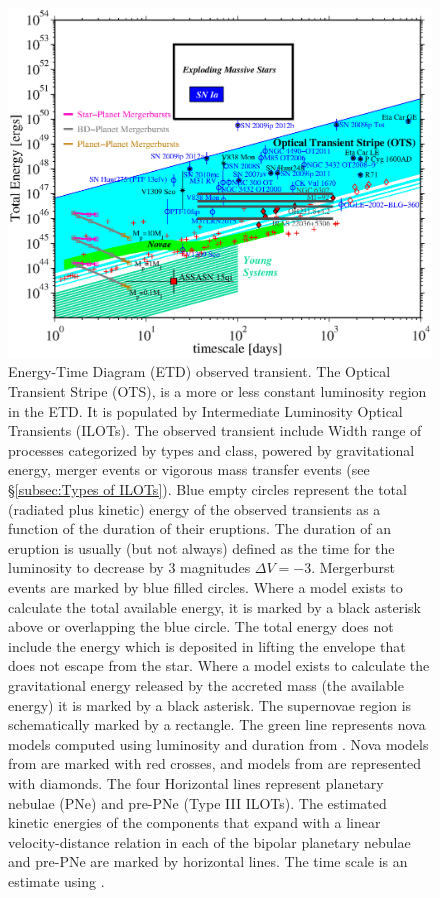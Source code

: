 \documentclass[a4paper,12pt,modern]{aastex62}
\begin{document}
\begin{figure}[ht!]
\includegraphics[width=\linewidth]{etd.eps}
\caption{Energy-Time Diagram (ETD) observed transient. The Optical Transient Stripe (OTS), is a more or less constant luminosity region in the ETD. It is populated by Intermediate Luminosity Optical Transients (ILOTs). The observed transient include Width range of processes categorized by types and class, powered by gravitational energy, merger events or vigorous mass transfer events (see \S\ref{subsec:Types of ILOTs}). Blue empty circles represent the total (radiated plus kinetic) energy of the observed transients as a function of the duration of their eruptions. The duration of an eruption is usually (but not always) defined as the time for the luminosity to decrease by 3 magnitudes $\Delta V=-3$. 
Mergerburst events are marked by blue filled circles. Where a model exists to calculate the total available energy, it is marked by a black asterisk above or overlapping the blue circle. The total energy does not include the energy which is deposited in lifting the envelope that does not escape from the star. Where a model exists to calculate the gravitational energy released by the accreted mass (the available energy) it is marked by a black asterisk.
The supernovae region is schematically marked by a rectangle. The green line represents nova models computed using luminosity and duration from \cite{1995ApJ...452..704D}. Nova models from \cite{2005ApJ...623..398Y} are marked with red crosses, and models from \cite{2010ApJ...725..831S} are represented with diamonds.
The four Horizontal lines represent planetary nebulae (PNe) and pre-PNe (Type III ILOTs). The estimated kinetic energies of the components that expand with a linear velocity-distance relation in each of the bipolar planetary nebulae and pre-PNe are marked by horizontal lines. The time scale is an estimate using \cite{2012ApJ...746..100S}.
}\label{fig:ilot-club}
\end{figure}
\end{document}
